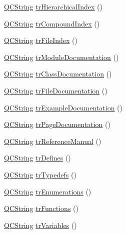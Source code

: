 \begin{DoxyCompactItemize}
\item 
\hyperlink{class_q_c_string}{Q\+C\+String} \hyperlink{class_translator_polish_a22916f0880b43ad121333e7b0b3330a5}{tr\+Hierarchical\+Index} ()
\item 
\hyperlink{class_q_c_string}{Q\+C\+String} \hyperlink{class_translator_polish_a1bd65c90ef68868e97c50b22fddeb273}{tr\+Compound\+Index} ()
\item 
\hyperlink{class_q_c_string}{Q\+C\+String} \hyperlink{class_translator_polish_a2cd2082e04d120d38eef506d576e930a}{tr\+File\+Index} ()
\item 
\hyperlink{class_q_c_string}{Q\+C\+String} \hyperlink{class_translator_polish_a157f3cda12be17ee13f61cc904c4dfd2}{tr\+Module\+Documentation} ()
\item 
\hyperlink{class_q_c_string}{Q\+C\+String} \hyperlink{class_translator_polish_ad0c01539dc5aec5091c0258ea6a869b4}{tr\+Class\+Documentation} ()
\item 
\hyperlink{class_q_c_string}{Q\+C\+String} \hyperlink{class_translator_polish_a7e86660e9e6797d66cd8f7513dda1f2d}{tr\+File\+Documentation} ()
\item 
\hyperlink{class_q_c_string}{Q\+C\+String} \hyperlink{class_translator_polish_adda882b0d8277983bbc5560fbc26aa78}{tr\+Example\+Documentation} ()
\item 
\hyperlink{class_q_c_string}{Q\+C\+String} \hyperlink{class_translator_polish_ac200e0c70374d86feca6ff709635dda3}{tr\+Page\+Documentation} ()
\item 
\hyperlink{class_q_c_string}{Q\+C\+String} \hyperlink{class_translator_polish_afc39e687267da214628ca4c2616e96a1}{tr\+Reference\+Manual} ()
\item 
\hyperlink{class_q_c_string}{Q\+C\+String} \hyperlink{class_translator_polish_aa4a9ddef7581b29a7640e519b86b4774}{tr\+Defines} ()
\item 
\hyperlink{class_q_c_string}{Q\+C\+String} \hyperlink{class_translator_polish_a64493b275b4674d073ab5b617c83d9df}{tr\+Typedefs} ()
\item 
\hyperlink{class_q_c_string}{Q\+C\+String} \hyperlink{class_translator_polish_a06464fe1c54e08523ce645256523dc8c}{tr\+Enumerations} ()
\item 
\hyperlink{class_q_c_string}{Q\+C\+String} \hyperlink{class_translator_polish_a8648a7b233ad0a4735508a56778183df}{tr\+Functions} ()
\item 
\hyperlink{class_q_c_string}{Q\+C\+String} \hyperlink{class_translator_polish_a027fd50abf0810dceb10013eb120f949}{tr\+Variables} ()
\item 

\end{DoxyCompactItemize}
